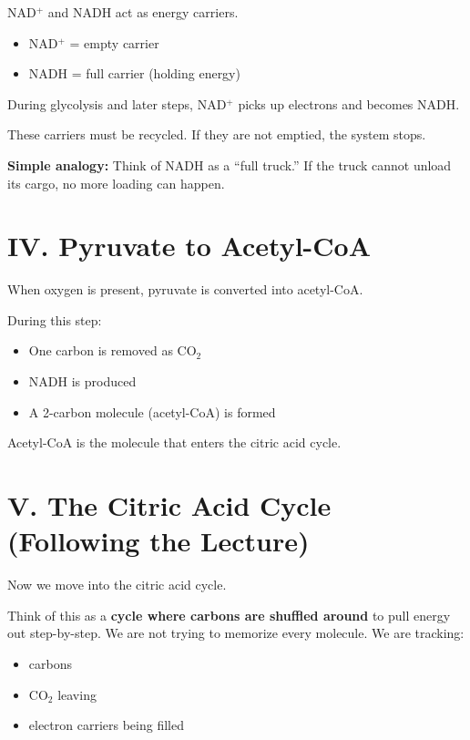 \documentclass[9pt]{article}
\begin{document}
NAD$^+$ and NADH act as energy carriers.

\begin{itemize}
\item NAD$^+$ = empty carrier
\item NADH = full carrier (holding energy)
\end{itemize}

During glycolysis and later steps, NAD$^+$ picks up electrons and becomes NADH.

These carriers must be recycled. If they are not emptied, the system stops.

\medskip
\textbf{Simple analogy:}  
Think of NADH as a “full truck.”  
If the truck cannot unload its cargo, no more loading can happen.


\section*{IV. Pyruvate to Acetyl-CoA}

When oxygen is present, pyruvate is converted into acetyl-CoA.

During this step:
\begin{itemize}
\item One carbon is removed as CO$_2$
\item NADH is produced
\item A 2-carbon molecule (acetyl-CoA) is formed
\end{itemize}

Acetyl-CoA is the molecule that enters the citric acid cycle.


\section*{V. The Citric Acid Cycle (Following the Lecture)}

Now we move into the citric acid cycle.

Think of this as a \textbf{cycle where carbons are shuffled around} to pull energy out step-by-step. We are not trying to memorize every molecule. We are tracking:

\begin{itemize}
\item carbons
\item CO$_2$ leaving
\item electron carriers being filled
\end{itemize}
\end{document}
